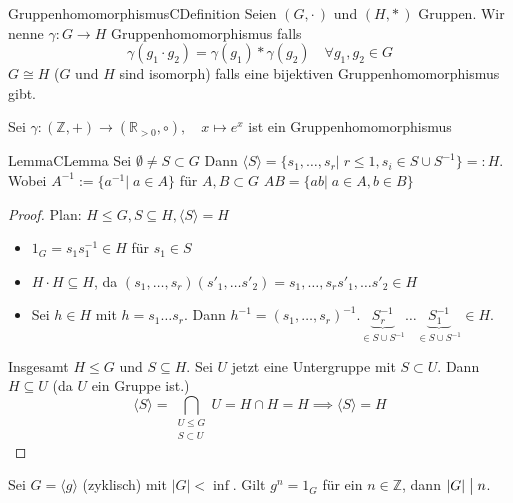 \documentclass[a4paper]{memoir}
\begin{document}
\begin{ibox}{1.10}{Gruppenhomomorphismus}{CDefinition}
    Seien $ (G, \cdot \,) $  und $ (H, * \,) $ Gruppen. Wir nenne $ \gamma : G 
    \to H $ Gruppenhomomorphismus falls
    $$ \gamma \left( g_1 \cdot g_2 \right) = \gamma(g_1) * \gamma(g_2) \quad \forall g_1, g_2  \in G $$
   $ G \cong H $ ($ G $ und $ H $ sind isomorph) falls eine bijektiven  Gruppenhomomorphismus gibt. 
\end{ibox}

Sei $ \gamma : ( \mathbb{Z}, + ) \to ( \mathbb{R}_{>0}, \circ),\quad x \mapsto e^{x} $ ist  ein Gruppenhomomorphismus
\begin{ibox}{1.11}{Lemma}{CLemma}
    Sei $ \emptyset \neq S \subset G $ Dann  $ \langle S \rangle = \{ s_1, \dots, s_r |\; r \leq 1, s_i \in S \cup S^{-1} \} =: H $.
    Wobei $ A^{-1} := \{a^{-1} | \; a \in A \} $ für $ A, B \subset G $ 
    \newline
    $ AB = \{ab|\; a \in A, b \in B \}$ 
\end{ibox}

\begin{proof}
    Plan: $ H \leq G, S \subseteq H, \langle S \rangle = H $ 
    \begin{itemize}
        \item $ 1_G = s_1 s_{1}^{-1} \in H  $ für $ s_1 \in S $ 
        \item $ H \cdot H \subseteq H $, da $ (s_1, \dots , s_r) (s'_1, \dots s'_2 ) =  s_1, \dots , s_r s'_1, \dots s'_2 \in H$ 
        \item Sei $ h \in H  $  mit $  h = s_1 \dots s_r  $. Dann $ h^{-1} = (s_1, \dots, s_r)^{-1}. \underbrace{S_r^{-1}}_{\in S \cup S^{-1}} \dots \underbrace{S_1^{-1}}_{\in S \cup S^{-1}} \in H$. 
    \end{itemize}
        Insgesamt $ H \leq G \text{ und } S \subseteq H. $ 
        \newline
        Sei $ U $ jetzt eine Untergruppe mit $ S \subset U $. Dann $ H \subseteq U $ (da $ U $ ein Gruppe ist.) 
        $$ \langle S \rangle = \bigcap_{\substack {U \leq G \\ S \subset U}} U = H \cap H = H \implies 
        \langle S \rangle = H$$
\end{proof}
        
Sei $ G = \langle g \rangle  $ (zyklisch) mit $ |G| < \inf  $. Gilt $ g^n = 1_G  $ für ein $ n \in \mathbb{Z} $, dann $ |G| \bigm| n $.
\end{document}

